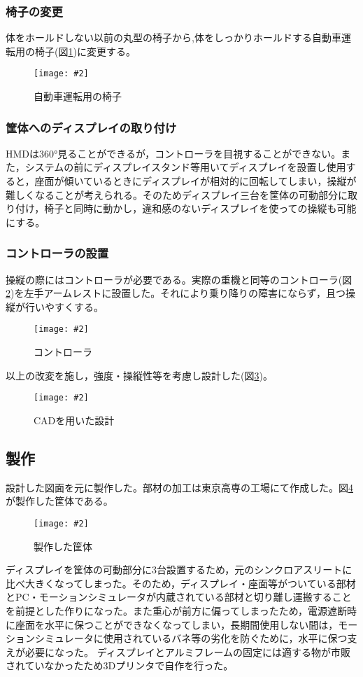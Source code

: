 \documentclass[a4paper,12pt]{jsarticle}
\newcommand{\figuref}[1]{図\ref{#1}}
\newcommand{\fig}[4][width=\textwidth]{
    \begin{figure}[!h]
    \begin{center}
    \texttt{[image: \#2]}
    \caption{#3}
    \label{#4}
    \vspace*{-1cm}
    \end{center}
    \end{figure}
}
\begin{document}
\subsubsection{椅子の変更}
体をホールドしない以前の丸型の椅子から,体をしっかりホールドする自動車運転用の椅子(\figuref{recaro})に変更する。
\fig[width=9cm]{image/recaro.png}{自動車運転用の椅子}{recaro}

\subsubsection{筐体へのディスプレイの取り付け}
HMDは360°見ることができるが，コントローラを目視することができない。また，システムの前にディスプレイスタンド等用いてディスプレイを設置し使用すると，座面が傾いているときにディスプレイが相対的に回転してしまい，操縦が難しくなることが考えられる。そのためディスプレイ三台を筐体の可動部分に取り付け，椅子と同時に動かし，違和感のないディスプレイを使っての操縦も可能にする。

\subsubsection{コントローラの設置}
操縦の際にはコントローラが必要である。実際の重機と同等のコントローラ(\figuref{controller})を左手アームレストに設置した。それにより乗り降りの障害にならず，且つ操縦が行いやすくする。
\fig[width=2cm]{image/controller.jpg}{コントローラ}{controller}

以上の改変を施し，強度・操縦性等を考慮し設計した(\figuref{cad})。
\fig[width=9cm]{image/cad.png}{CADを用いた設計}{cad}
\clearpage

\subsection{製作}
設計した図面を元に製作した。部材の加工は東京高専の工場にて作成した。\figuref{body}が製作した筐体である。
\fig[width=9cm]{image/body.jpg}{製作した筐体}{body}

ディスプレイを筐体の可動部分に3台設置するため，元のシンクロアスリートに比べ大きくなってしまった。そのため，ディスプレイ・座面等がついている部材とPC・モーションシミュレータが内蔵されている部材と切り離し運搬することを前提とした作りになった。また重心が前方に偏ってしまったため，電源遮断時に座面を水平に保つことができなくなってしまい，長期間使用しない間は，モーションシミュレータに使用されているバネ等の劣化を防ぐために，水平に保つ支えが必要になった。
ディスプレイとアルミフレームの固定には適する物が市販されていなかったため3Dプリンタで自作を行った。
\end{document}
